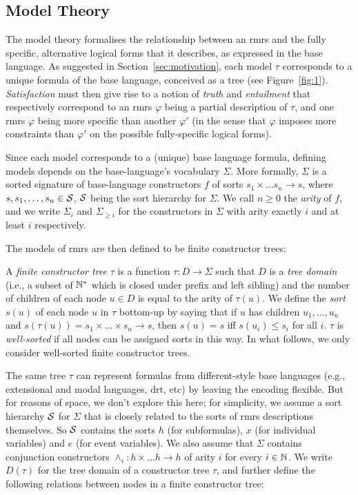 \subsection{Model Theory}

The model theory formalises the relationship between an {\sc rmrs} and
the fully specific, alternative logical forms that it describes, as
expressed in the base language.
As suggested in Section~\ref{sec:motivation},  each model $\tau$
corresponds to a unique formula of the base language, conceived as a
tree (see Figure~\ref{fig:1}).  {\em Satisfaction} must then give rise
to a notion of {\em 
  truth} and {\em entailment} that respectively correspond to an {\sc
  rmrs} $\varphi$ being a partial description of $\tau$, and one {\sc
  rmrs} $\varphi$ being more specific than another $\varphi'$ (in the sense that
$\varphi$ imposes more
constraints than $\varphi'$ on the possible fully-specific logical forms).

Since each model corresponds to a (unique) base language formula, defining
models depends on the base-language's vocabulary $\Sigma$.  More
formally, $\Sigma$ is a sorted signature of
base-language constructors $f$ of sorts $s_1\times\ldots
s_n\rightarrow s$,
where $s,s_1,\ldots,s_n\in {\cal S}$, ${\cal S}$ being the sort
hierarchy for $\Sigma$.  We call $n\geq 0$ the {\em arity} of $f$, and
we write $\Sigma_i$ and $\Sigma_{\geq i}$ for the constructors in $\Sigma$
with arity exactly $i$ and at least $i$ respectively.

The models of {\sc rmrs} are then defined to be finite constructor
trees:
\begin{definition}\label{defn:models}
A {\em finite constructor tree} $\tau$ is
a function $\tau:D
\rightarrow \Sigma$ such that $D$ is a \emph{tree domain} (i.e., a subset of
$\mathbb{N}^*$ which is closed under prefix and left sibling) and the number
of children of each node $u \in D$ is equal to the arity of $\tau(u)$.
We define the \emph{sort} $s(u)$ of each node $u$ in $\tau$ bottom-up
by saying that if $u$ has children $u_1,\ldots,u_n$ and $s(\tau(u)) =
s_1 \times \ldots \times s_n \rightarrow s$, then $s(u) = s$ iff
$s(u_i) \leq s_i$ for all $i$.  $\tau$ is \emph{well-sorted} if
all nodes can be assigned sorts in this way.  In what follows, we only consider
well-sorted finite constructor trees.
\end{definition}

The same tree $\tau$ can
represent formulas from different-style base languages (e.g.,
extensional and modal languages, {\sc drt}, etc) by 
leaving the encoding flexible.  But for reasons 
of space, we don't
explore this here; for simplicity, we
assume a sort hierarchy ${\cal S}$ for $\Sigma$ that is
closely related to the sorts of {\sc rmrs} descriptions
themselves.  So ${\cal S}$ contains the sorts
$h$ (for subformulas), $x$ (for individual variables) and $e$ (for event
variables).
We also
assume that $\Sigma$ contains conjunction constructors
$\wedge_i: h\times\ldots h\rightarrow h$ of arity $i$ for every
$i\in \mathbb{N}$.  We write $D(\tau)$ for the tree domain of a
constructor tree $\tau$, and further define the following relations
between nodes in a finite constructor tree:


